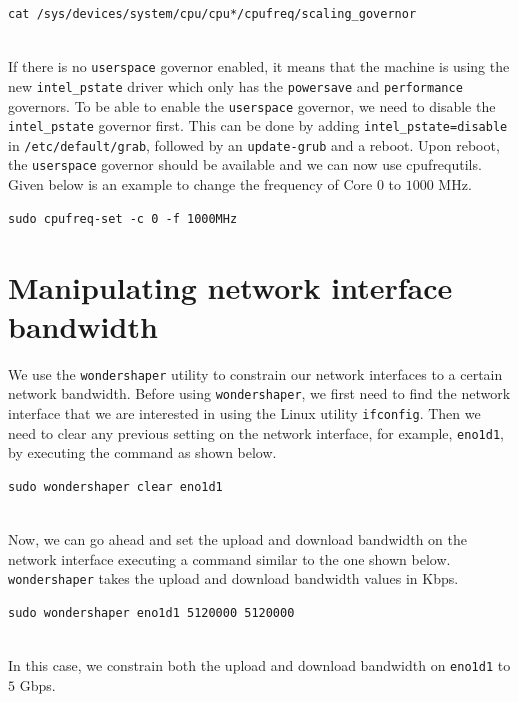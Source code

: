 \documentclass[11pt]{article}
\newcommand{\code}[1]{\colorbox{light-gray}{\texttt{#1}}}
\begin{document}
\begin{verbatim}
cat /sys/devices/system/cpu/cpu*/cpufreq/scaling_governor
\end{verbatim}
\\
If there is no \code{userspace} governor enabled, it means that the machine is using the new \code{intel\_pstate} driver which only has the \code{powersave} and \code{performance} governors. To be able to enable the \code{userspace} governor, we need to disable the \code{intel\_pstate} governor first. This can be done by adding \code{intel\_pstate=disable} in \code{/etc/default/grab}, followed by an \code{update-grub} and a reboot. Upon reboot, the \code{userspace} governor should be available and we can now use cpufrequtils. Given below is an example to change the frequency of Core $0$ to $1000$ MHz.
\begin{verbatim}
sudo cpufreq-set -c 0 -f 1000MHz
\end{verbatim}

\section{Manipulating network interface bandwidth}
\label{sec:app-net}

We use the \code{wondershaper} utility to constrain our network interfaces to a certain network bandwidth. Before using \code{wondershaper}, we first need to find the network interface that we are interested in using the Linux utility \code{ifconfig}. Then we need to clear any previous setting on the network interface, for example, \code{eno1d1}, by executing the command as shown below.
\begin{verbatim}
sudo wondershaper clear eno1d1
\end{verbatim}
\\
Now, we can go ahead and set the upload and download bandwidth on the network interface executing a command similar to the one shown below. \code{wondershaper} takes the upload and download bandwidth values in Kbps.
\begin{verbatim}
sudo wondershaper eno1d1 5120000 5120000
\end{verbatim}
\\
In this case, we constrain both the upload and download bandwidth on \code{eno1d1} to $5$ Gbps.
\end{document}
